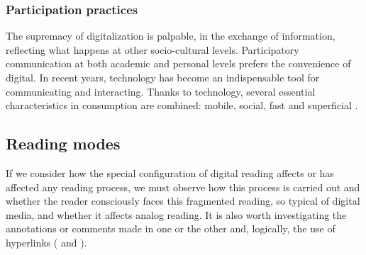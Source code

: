\documentclass[english]{textolivre}
\begin{document}
\subsubsection{Participation practices}
The supremacy of digitalization is palpable, in the exchange of information, reflecting what happens at other socio-cultural levels. Participatory communication at both academic and personal levels prefers the convenience of digital. In recent years, technology has become an indispensable tool for communicating and interacting. Thanks to technology, several essential characteristics in consumption are combined: mobile, social, fast and superficial \cite{yuste2015nuevas}. \\

\subsection{Reading modes}
If we consider how the special configuration of digital reading affects or has affected any reading process, we must observe how this process is carried out and whether the reader consciously faces this fragmented reading, so typical of digital media, and whether it affects analog reading. It is also worth investigating the annotations or comments made in one or the other and, logically, the use of hyperlinks ( and ). 
\end{document}
